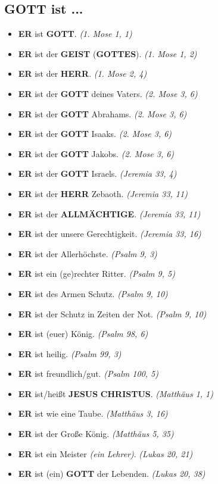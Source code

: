 \documentclass[12pt,a5paper]{article}
\newcommand{\Allmaechtige}[0]{\textbf{ALLM\"ACHTIGE}}
\newcommand{\Christus}[0]{\textbf{CHRISTUS}}
\newcommand{\Er}[0]{\textbf{ER}}
\newcommand{\Geist}[0]{\textbf{GEIST}}
\newcommand{\Gottes}[0]{\textbf{GOTTES}}
\newcommand{\Gott}[0]{\textbf{GOTT}}
\newcommand{\Herr}[0]{\textbf{HERR}}
\newcommand{\Jesus}[0]{\textbf{JESUS}}
\begin{document}
	\subsection{{\Gott} ist ...}
		\begin{itemize}[nosep]
			\item {\Er} ist {\Gott}. \textit{(1. Mose 1, 1)}
			\item {\Er} ist der {\Geist} ({\Gottes}). \textit{(1. Mose 1, 2)}
			\item {\Er} ist der {\Herr}. \textit{(1. Mose 2, 4)}
			\item {\Er} ist der {\Gott} deines Vaters. \textit{(2. Mose 3, 6)}
			\item {\Er} ist der {\Gott} Abrahams. \textit{(2. Mose 3, 6)}
			\item {\Er} ist der {\Gott} Isaaks. \textit{(2. Mose 3, 6)}
			\item {\Er} ist der {\Gott} Jakobs. \textit{(2. Mose 3, 6)}
			\item {\Er} ist der {\Gott} Israels. \textit{(Jeremia 33, 4)}
			\item {\Er} ist der {\Herr} Zebaoth. \textit{(Jeremia 33, 11)}
			\item {\Er} ist der {\Allmaechtige}. \textit{(Jeremia 33, 11)}
			\item {\Er} ist der unsere Gerechtigkeit. \textit{(Jeremia 33, 16)}
			\item {\Er} ist der Allerh\"ochste. \textit{(Psalm 9, 3)}
			\item {\Er} ist ein (ge)rechter Ritter. \textit{(Psalm 9, 5)}
			\item {\Er} ist des Armen Schutz. \textit{(Psalm 9, 10)}
			\item {\Er} ist der Schutz in Zeiten der Not. \textit{(Psalm 9, 10)}
			\item {\Er} ist (euer) König. \textit{(Psalm 98, 6)}
			\item {\Er} ist heilig. \textit{(Psalm 99, 3)}
			\item {\Er} ist freundlich/gut. \textit{(Psalm 100, 5)}
			\item {\Er} ist/hei{\ss}t {\Jesus} {\Christus}. \textit{(Matth\"aus 1, 1)}
			\item {\Er} ist wie eine Taube. \textit{(Matth\"aus 3, 16)}
			\item {\Er} ist der Gro{\ss}e K\"onig. \textit{(Matth\"aus 5, 35)}
			\item {\Er} ist ein Meister \textit{(ein Lehrer)}. \textit{(Lukas 20, 21)}
			\item {\Er} ist (ein) {\Gott} der Lebenden. \textit{(Lukas 20, 38)}		

\end{itemize}
\end{document}
